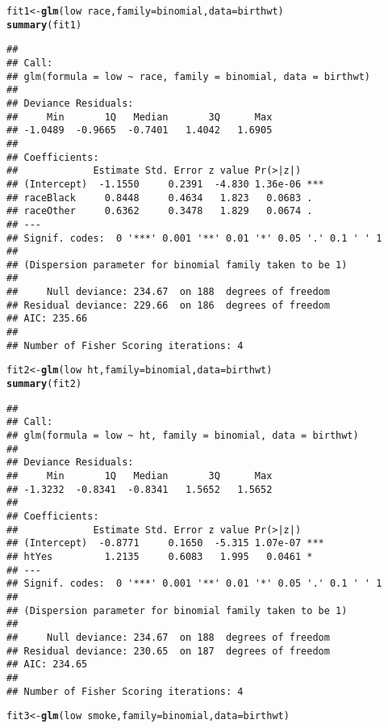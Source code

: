 \documentclass{article}\usepackage[]{graphicx}\usepackage[]{color}
\makeatletter
\newcommand{\hlopt}[1]{\textcolor[rgb]{0,0,0}{#1}}%
\newcommand{\hlstd}[1]{\textcolor[rgb]{0.345,0.345,0.345}{#1}}%
\newcommand{\hlkwb}[1]{\textcolor[rgb]{0.69,0.353,0.396}{#1}}%
\newcommand{\hlkwc}[1]{\textcolor[rgb]{0.333,0.667,0.333}{#1}}%
\newcommand{\hlkwd}[1]{\textcolor[rgb]{0.737,0.353,0.396}{\textbf{#1}}}%
\newenvironment{kframe}{%
 \def\at@end@of@kframe{}%
 \ifinner\ifhmode%
  \def\at@end@of@kframe{\end{minipage}}%
  \begin{minipage}{\columnwidth}%
 \fi\fi%
 \def\FrameCommand##1{\hskip\@totalleftmargin \hskip-\fboxsep
 \colorbox{shadecolor}{##1}\hskip-\fboxsep
     \hskip-\linewidth \hskip-\@totalleftmargin \hskip\columnwidth}%
 \MakeFramed {\advance\hsize-\width
   \@totalleftmargin\z@ \linewidth\hsize
   \@setminipage}}%
 {\par\unskip\endMakeFramed%
 \at@end@of@kframe}
\newenvironment{knitrout}{}{} %
\makeatother
\begin{document}
\begin{knitrout}
\color{fgcolor}\begin{kframe}
\begin{alltt}
\hlstd{fit1} \hlkwb{<-} \hlkwd{glm}\hlstd{(low} \hlopt{~} \hlstd{race,} \hlkwc{family} \hlstd{= binomial,} \hlkwc{data} \hlstd{= birthwt)}
\hlkwd{summary}\hlstd{(fit1)}
\end{alltt}
\begin{verbatim}
## 
## Call:
## glm(formula = low ~ race, family = binomial, data = birthwt)
## 
## Deviance Residuals: 
##     Min       1Q   Median       3Q      Max  
## -1.0489  -0.9665  -0.7401   1.4042   1.6905  
## 
## Coefficients:
##             Estimate Std. Error z value Pr(>|z|)    
## (Intercept)  -1.1550     0.2391  -4.830 1.36e-06 ***
## raceBlack     0.8448     0.4634   1.823   0.0683 .  
## raceOther     0.6362     0.3478   1.829   0.0674 .  
## ---
## Signif. codes:  0 '***' 0.001 '**' 0.01 '*' 0.05 '.' 0.1 ' ' 1
## 
## (Dispersion parameter for binomial family taken to be 1)
## 
##     Null deviance: 234.67  on 188  degrees of freedom
## Residual deviance: 229.66  on 186  degrees of freedom
## AIC: 235.66
## 
## Number of Fisher Scoring iterations: 4
\end{verbatim}
\begin{alltt}
\hlstd{fit2} \hlkwb{<-} \hlkwd{glm}\hlstd{(low} \hlopt{~} \hlstd{ht,} \hlkwc{family} \hlstd{= binomial,} \hlkwc{data} \hlstd{= birthwt)}
\hlkwd{summary}\hlstd{(fit2)}
\end{alltt}
\begin{verbatim}
## 
## Call:
## glm(formula = low ~ ht, family = binomial, data = birthwt)
## 
## Deviance Residuals: 
##     Min       1Q   Median       3Q      Max  
## -1.3232  -0.8341  -0.8341   1.5652   1.5652  
## 
## Coefficients:
##             Estimate Std. Error z value Pr(>|z|)    
## (Intercept)  -0.8771     0.1650  -5.315 1.07e-07 ***
## htYes         1.2135     0.6083   1.995   0.0461 *  
## ---
## Signif. codes:  0 '***' 0.001 '**' 0.01 '*' 0.05 '.' 0.1 ' ' 1
## 
## (Dispersion parameter for binomial family taken to be 1)
## 
##     Null deviance: 234.67  on 188  degrees of freedom
## Residual deviance: 230.65  on 187  degrees of freedom
## AIC: 234.65
## 
## Number of Fisher Scoring iterations: 4
\end{verbatim}
\begin{alltt}
\hlstd{fit3} \hlkwb{<-} \hlkwd{glm}\hlstd{(low} \hlopt{~} \hlstd{smoke,} \hlkwc{family} \hlstd{= binomial,} \hlkwc{data} \hlstd{= birthwt)}

\end{alltt}
\end{kframe}
\end{knitrout}
\end{document}

